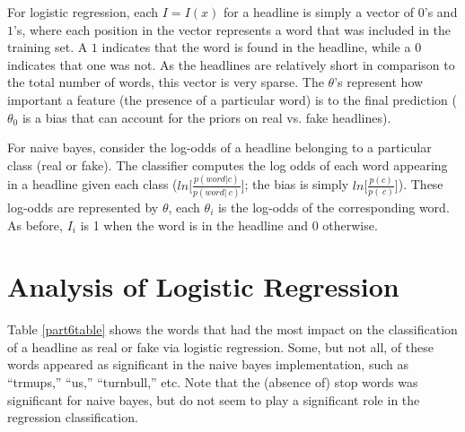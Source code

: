 \documentclass{article}
\begin{document}
   For logistic regression, each $I = I(x)$ for a headline is simply a vector of $0$'s and $1$'s, where each
   position in the vector represents a word that was included in the training set. A $1$ indicates that the
   word is found in the headline, while a $0$ indicates that one was not. As the headlines are relatively short
   in comparison to the total number of words, this vector is very sparse. The $\theta$'s represent how important
   a feature (the presence of a particular word) is to the final prediction ($\theta_0$ is a bias that can
   account for the priors on real vs. fake headlines).

   For naive bayes, consider the log-odds of a headline belonging to a particular class (real or fake). The
   classifier computes the log odds of each word appearing in a headline given each class
   ($ln \big[ \frac{p(word | c)}{p(word | ~c)} \big]$; the bias is simply $ln \big[ \frac{p(c)}{p(~c)}\big]$).
   These log-odds are represented by $\theta$, each $\theta_i$ is the log-odds of the corresponding word.
   As before, $I_i$ is 1 when the word is in the headline and 0 otherwise.



   \section{Analysis of Logistic Regression}
   Table \ref{part6table} shows the words that had the most impact on the classification of a headline
   as real or fake via logistic regression. Some, but not all, of these words appeared as significant
   in the naive bayes implementation, such as ``trmups,'' ``us,'' ``turnbull,'' etc. Note that the (absence
   of) stop words was significant for naive bayes, but do not seem to play a significant role in
   the regression classification.
\end{document}
